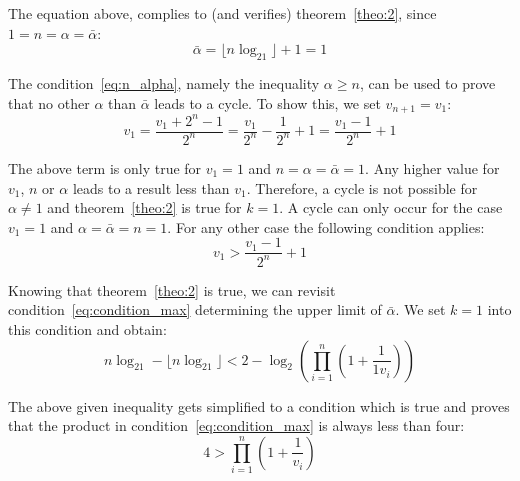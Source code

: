 The equation above, complies to (and verifies) theorem~\ref{theo:2}, since $1=n=\alpha=\bar\alpha$:
\[
\bar\alpha=\lfloor n\log_21\rfloor+1=1
\]

The condition~\ref{eq:n_alpha}, namely the inequality $\alpha\ge n$, can be used to prove that no other $\alpha$ than $\bar\alpha$ leads to a cycle. To show this, we set $v_{n+1}=v_1$:
\[
v_1=\frac{v_1+2^n-1}{2^n}=\frac{v_1}{2^n}-\frac{1}{2^n}+1=\frac{v_1-1}{2^n}+1
\]

The above term is only true for $v_1=1$ and $n=\alpha=\bar\alpha=1$. Any higher value for $v_1$, $n$ or $\alpha$ leads to a result less than $v_1$. Therefore, a cycle is not possible for $\alpha\ne 1$ and theorem~\ref{theo:2} is true for $k=1$. A cycle can only occur for the case $v_1=1$ and $\alpha=\bar\alpha=n=1$. For any other case the following condition applies:
\[
v_1>\frac{v_1-1}{2^n}+1
\]

Knowing that theorem~\ref{theo:2} is true, we can revisit condition~\ref{eq:condition_max} determining the upper limit of $\bar\alpha$. We set $k=1$ into this condition and obtain:
\begin{equation}
n\log_21-\lfloor n\log_21\rfloor<2-\log_2\left(\prod_{i=1}^{n}\left(1+\frac{1}{1v_{i}}\right)\right)
\end{equation}

The above given inequality gets simplified to a condition which is true and proves that the product in condition~\ref{eq:condition_max} is always less than four:
\[
4>\prod_{i=1}^{n}\left(1+\frac{1}{v_{i}}\right)
\]





